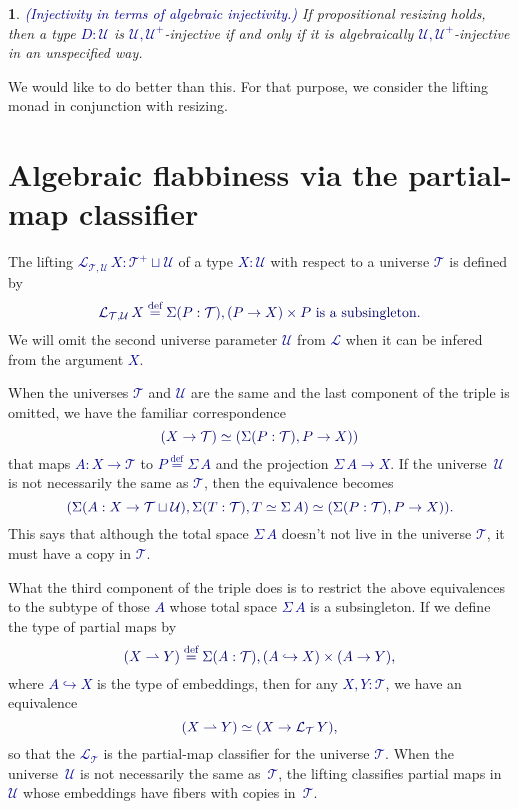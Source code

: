 \documentclass[10pt]{article}
\newcommand{\db}{\textcolor{darkblue}}
\newcommand{\emb}{\hookrightarrow}
\newcommand{\partialto}{\rightharpoonup}
\newcommand{\df}[1]{\emph{\db{#1}}}
\newcommand{\m}[1]{\db{$#1$}}
\newcommand{\M}[1]{\[\db{#1}\]}
\newcommand{\U}{\mathcal{U}}
\newcommand{\T}{\mathcal{T}}
\newcommand{\Lift}{\mathcal{L}}
\newcommand{\eqdef}{\overset{\text{def}}{=}}
\newtheorem{numbered}{}
\theoremstyle{definition}
\begin{document}
\begin{numbered} \label{worse} \df{(Injectivity in terms of algebraic injectivity.)}
  If propositional resizing holds, then a type \m{D : \U} is \m{\U,\U^+}-injective if and only if it is algebraically \m{\U,\U^+}-injective in an unspecified way.
\end{numbered}

We would like to do better than this. For that purpose, we consider
the lifting monad in conjunction with resizing.

\section{Algebraic flabbiness via the partial-map classifier}

The lifting \m{\Lift_{\T,\U} \, X : \T^+ \sqcup \U} of a type \m{X:\U}
with respect to a universe \m{\T} %
is defined by
%
\M{ \Lift_{\T,\U}\, X \eqdef \Sigma (P : \T), (P \to X) \times
  \text{\m{P} is a subsingleton}.  }
%
We will omit the second universe parameter \m{\U} from \m{\Lift} when
it can be infered from the argument \m{X}.

When the universes \m{\T} and \m{\U} are the same and the last
component of the triple is omitted, we have the familiar
correspondence
%
\M{
  (X \to \T) \simeq (\Sigma (P : \T), P \to X))
}
%
that maps \m{A : X \to \T} to \m{P \eqdef \Sigma \, A} and the
projection \m{\Sigma \, A \to X}.  If the universe~\m{\U} is not
necessarily the same as \m{\T}, then the equivalence becomes
%
\M{
  (\Sigma (A : X \to \T \sqcup \U), \Sigma(T : \T), T \simeq \Sigma \, A) \simeq (\Sigma (P : \T), P \to X)).
}
%
This says that although the total space \m{\Sigma \, A} doesn't not
live in the universe \m{\T}, it must have a copy in \m{\T}.

What the third component of the triple does is to restrict the above
equivalences to the subtype of those \m{A} whose total space \m{\Sigma
  \, A} is a subsingleton. If we define the type of partial maps by
%
\M{(X \partialto Y) \eqdef \Sigma (A : \T), (A \emb X) \times (A \to Y),
}
%
where \m{A \emb X} is the type of embeddings, then for any \m{X,Y :
  \T}, we have an equivalence
%
\M{
  (X \partialto Y)
  \simeq (X \to \Lift_{\T} \, Y),
}
%
so that the \m{\Lift_{\T}} is the partial-map classifier for the universe
\m{\T}.  When the universe~\m{\U} is not necessarily the same
as~\m{\T}, the lifting classifies partial maps in~\m{\U} whose
embeddings have fibers with copies in~\m{\T}.
\end{document}

